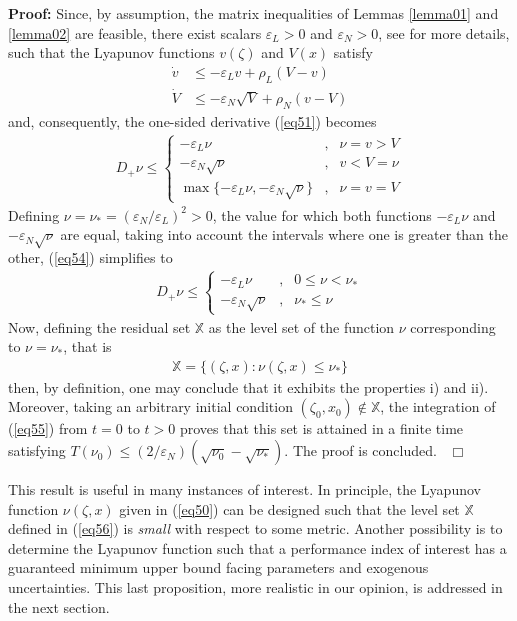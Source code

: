 \documentclass[twocolumn]{autarc_LH}
\newenvironment{proof}{\begin{trivlist} \item[{ \bf Proof:}] }
{~\hfill$\Box$ \end{trivlist} }
\begin{document}
\begin{proof} Since, by assumption, the matrix inequalities of  Lemmas \ref{lemma01} and \ref{lemma02} are feasible, there exist scalars $\varepsilon_L>0$ and $\varepsilon_N>0$, see \cite{gero:2023} for more details, such that the Lyapunov functions $v(\zeta)$ and $V(x)$ satisfy 
\begin{align} 
\label{eq52} \dot v & \leq -\varepsilon_L v +  \rho_L  ( V - v )\\
\label{eq53} \dot V  & \leq  - \varepsilon_N \sqrt{V} + \rho_N ( v - V )
\end{align}
and, consequently, the one-sided derivative (\ref{eq51}) becomes 
\begin{align} 
\label{eq54}  D_+ \nu \leq \left \{ \begin{array}{ccc} -\varepsilon_L \nu &,& \nu=v > V \\  - \varepsilon_N \sqrt{\nu}&,& v < V = \nu \\  \max\{-\varepsilon_L \nu, - \varepsilon_N \sqrt{\nu} \} &,& \nu = v = V \end{array} \right .   
\end{align}
Defining $\nu=\nu_* = (\varepsilon_N/\varepsilon_L)^2>0$, the value for which both functions $-\varepsilon_L \nu$ and $- \varepsilon_N \sqrt{\nu}$ are equal, taking into account the intervals where one is greater than the other, (\ref{eq54}) simplifies to
\begin{align} 
\label{eq55}  D_+ \nu \leq \left \{ \begin{array}{ccc} -\varepsilon_L \nu &,& 0 \leq \nu < \nu_* \\  - \varepsilon_N \sqrt{\nu}&,& \nu_* \leq  \nu \end{array} \right .   
\end{align}
Now, defining the residual set $\mathbb{X}$ as the level set of the function $\nu$ corresponding to $\nu = \nu_*$, that is 
\begin{align} 
\label{eq56}  \mathbb{X} = \{ (\zeta, x) : \nu(\zeta,x) \leq \nu_* \} 
\end{align}
then, by definition, one may conclude that it exhibits the properties i) and ii). Moreover, taking an arbitrary initial condition $(\zeta_0, x_0) \notin \mathbb{X}$, the integration of (\ref{eq55}) from $t=0$ to $t>0$ proves that this set is attained in a finite time satisfying $T(\nu_0) \leq (2/\varepsilon_N) ( \sqrt{\nu_0} - \sqrt{\nu_*})$. The proof is concluded. 
\end{proof}

This result is useful in many instances of interest. In principle, the Lyapunov function $\nu(\zeta,x)$ given in (\ref{eq50}) can be designed such that the level set $\mathbb{X}$ defined in (\ref{eq56}) is {\em small} with respect to some metric. Another possibility is to determine the Lyapunov function such that a performance index of interest has a guaranteed minimum upper bound facing parameters and exogenous uncertainties. This last proposition, more realistic in our opinion, is addressed in the next section. 
\end{document}
